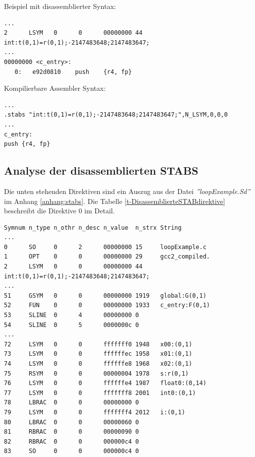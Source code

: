 Beispiel mit disassemblierter Syntax:
\lstset{language=plain}
\begin{lstlisting}
...
2      LSYM   0      0      00000000 44     int:t(0,1)=r(0,1);-2147483648;2147483647;
...
00000000 <c_entry>:
   0:	e92d0810 	push	{r4, fp}
\end{lstlisting}


Kompilierbare Assembler Syntax:
\lstset{language=plain}
\begin{lstlisting}
...
.stabs "int:t(0,1)=r(0,1);-2147483648;2147483647;",N_LSYM,0,0,0
...
c_entry:
push {r4, fp}
\end{lstlisting}


\subsection{Analyse der disassemblierten STABS}
\FloatBarrier

Die unten stehenden Direktiven sind ein Auszug aus der Datei \textit{''loopExample.Sd''} im Anhang \ref{anhang:stabs}.
Die Tabelle \ref{t-DisassemblierteSTABdirektive} beschreibt die Direktive 0 im Detail.
\lstset{language=plain}
\begin{lstlisting}
Symnum n_type n_othr n_desc n_value  n_strx String
...
0      SO     0      2      00000000 15     loopExample.c
1      OPT    0      0      00000000 29     gcc2_compiled.
2      LSYM   0      0      00000000 44     int:t(0,1)=r(0,1);-2147483648;2147483647;
...
51     GSYM   0      0      00000000 1919   global:G(0,1)
52     FUN    0      0      00000000 1933   c_entry:F(0,1)
53     SLINE  0      4      00000000 0 
54     SLINE  0      5      0000000c 0     
...
72     LSYM   0      0      fffffff0 1948   x00:(0,1)
73     LSYM   0      0      ffffffec 1958   x01:(0,1)
74     LSYM   0      0      ffffffe8 1968   x02:(0,1)
75     RSYM   0      0      00000004 1978   s:r(0,1)
76     LSYM   0      0      ffffffe4 1987   float0:(0,14)
77     LSYM   0      0      fffffff8 2001   int0:(0,1)
78     LBRAC  0      0      00000000 0      
79     LSYM   0      0      fffffff4 2012   i:(0,1)
80     LBRAC  0      0      00000060 0      
81     RBRAC  0      0      00000090 0      
82     RBRAC  0      0      000000c4 0      
83     SO     0      0      000000c4 0 
\end{lstlisting}

